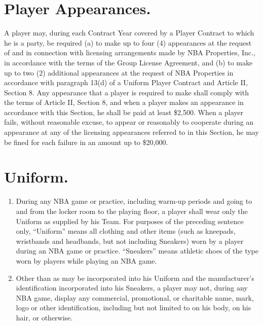 \documentclass[
]{book}
\providecommand{\tightlist}{%
  \setlength{\itemsep}{0pt}\setlength{\parskip}{0pt}}
\begin{document}
\hypertarget{player-appearances.}{%
\section{Player Appearances.}\label{player-appearances.}}

A player may, during each Contract Year covered by a Player Contract to which he is a party, be required (a) to make up to four (4) appearances at the request of and in connection with licensing arrangements made by NBA Properties, Inc., in accordance with the terms of the Group License Agreement, and (b) to make up to two (2) additional appearances at the request of NBA Properties in accordance with paragraph 13(d) of a Uniform Player Contract and Article II, Section 8. Any appearance that a player is required to make shall comply with the terms of Article II, Section 8, and when a player makes an appearance in accordance with this Section, he shall be paid at least \$2,500. When a player fails, without reasonable excuse, to appear or reasonably to cooperate during an appearance at any of the licensing appearances referred to in this Section, he may be fined for each failure in an amount up to \$20,000.

\hypertarget{uniform.}{%
\section{Uniform.}\label{uniform.}}

\begin{enumerate}
\def\labelenumi{(\alph{enumi})}
\tightlist
\item
  During any NBA game or practice, including warm-up periods and going to and from the locker room to the playing floor, a player shall wear only the Uniform as supplied by his Team. For purposes of the preceding sentence only, ``Uniform'' means all clothing and other items (such as kneepads, wristbands and headbands, but not including Sneakers) worn by a player during an NBA game or practice. ``Sneakers'' means athletic shoes of the type worn by players while playing an NBA game.
\item
  Other than as may be incorporated into his Uniform and the manufacturer's identification incorporated into his Sneakers, a player may not, during any NBA game, display any commercial, promotional, or charitable name, mark, logo or other identification, including but not limited to on his body, on his hair, or otherwise.
\end{enumerate}
\end{document}
